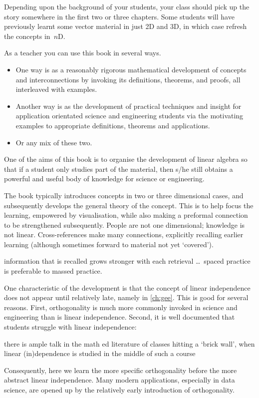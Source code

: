Depending upon the background of your students, your class should pick up the story somewhere in the first two or three chapters.
Some students will have previously learnt some vector material in just 2D and 3D,  in which case refresh the concepts in~\(n\)D.

As a teacher you can use this book in several ways.
\begin{itemize}
\item One way is as a reasonably rigorous mathematical development of concepts and interconnections by invoking its definitions, theorems, and proofs, all interleaved with examples.
\item Another way is as the development of practical techniques and insight for application orientated science and engineering students via the motivating examples to appropriate definitions, theorems and applications. 
\item Or any mix of these two.
\end{itemize}

One of the aims of this book is to organise the development of linear algebra so that if a student only studies part of the material, then s/he still obtains a powerful and useful body of knowledge for science or engineering.

The book typically introduces concepts in two or three dimensional cases, and subsequently develops the general theory of the concept.  
This is to help focus the learning, empowered by visualisation, while also making a preformal connection to be strengthened subsequently.
People are not one dimensional; knowledge is not linear.
Cross-references make many connections, explicitly recalling earlier learning (although sometimes forward to material not yet `covered').
\begin{quoted}{\cite{Halpern2003}}%
information that is recalled grows stronger with each retrieval \ldots\ spaced practice is preferable to massed practice.
\end{quoted}

One characteristic of the development is that the concept of linear independence does not appear until relatively late, namely in \cref{ch:gee}.
This is good for several reasons.
First, orthogonality is much more commonly invoked in science and engineering than is linear independence.
Second, it is well documented that students struggle with linear independence:
\begin{quoted}{\cite{Uhlig02}}
there is ample talk in the math ed literature of classes hitting a `brick wall', when linear (in)dependence is studied in the middle of such a course
\end{quoted}
Consequently, here we learn the more specific orthogonality before the more abstract linear independence.
Many modern applications, especially in data science, are opened up by the relatively early introduction of orthogonality.

